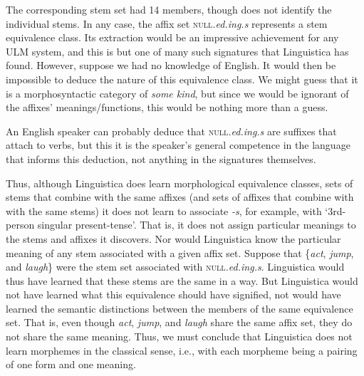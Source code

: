 The corresponding stem set had 14 members, though \cite{goldsmith:2001} 
does not identify the individual stems. 
In any case, the affix set \textsc{null}\textit{.ed.ing.s} represents 
a stem equivalence class. Its extraction would be an impressive achievement for any \ac{ULM}  system, and this
is but one of many such signatures that Linguistica has found. However, 
suppose we had no knowledge of English. It would then be impossible to deduce the nature 
of this equivalence class. We might
guess that it is a morphosyntactic category of \emph{some kind}, but since we would be ignorant
of the affixes' meanings/functions, this would be nothing more than a guess. 

An English speaker can probably deduce that \textsc{null}\textit{.ed.ing.s} are suffixes that attach to verbs,
but this it is the speaker's general competence in the language that informs this deduction, not anything in the 
signatures themselves. 

Thus, although Linguistica does learn morphological equivalence classes, 
sets of stems that combine with the same affixes 
(and sets of affixes that combine with with the same stems) 
it does not learn to associate \textit{-s}, for example, 
with `3rd-person singular present-tense'. That is, it does not assign particular
meanings to the stems and affixes it discovers.
Nor would Linguistica know the particular meaning of any stem 
associated with a given affix set. 
Suppose that \{\textit{act}, \emph{jump}, and \emph{laugh}\} 
were the stem set associated with \textsc{null}\textit{.ed.ing.s}. 
Linguistica would thus have learned that these stems are the same 
in a way. But Linguistica would not have learned what this 
equivalence should have signified, not would have learned the semantic 
distinctions between the members of the same equivalence set. 
That is, even though \textit{act}, \emph{jump}, and \emph{laugh} 
share the same affix set, they do not share the same meaning. 
Thus, we must conclude that Linguistica does not learn morphemes 
in the classical sense, i.e., with each morpheme being a
pairing of one form and one meaning.

